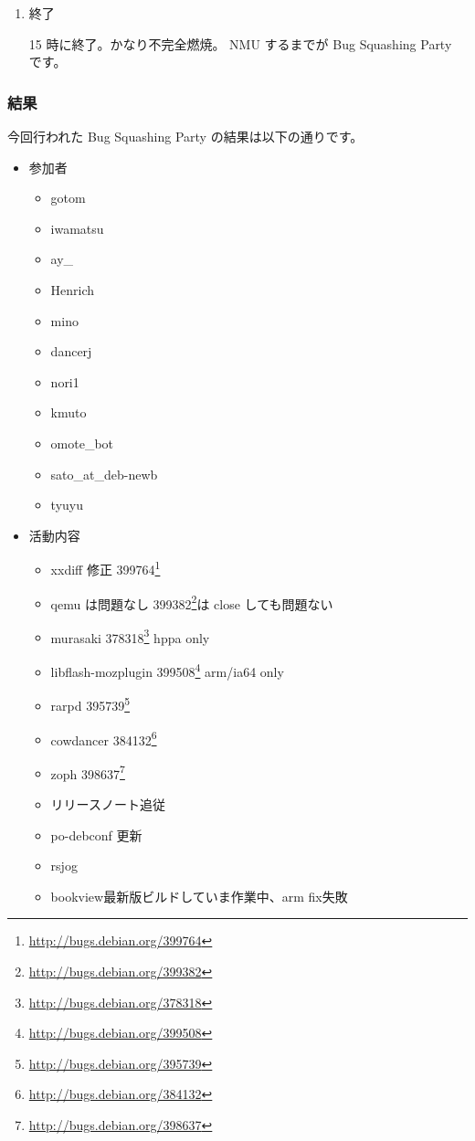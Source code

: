 \documentclass[mingoth,a4paper]{jsarticle}
\newcommand{\debianbug}[1]{#1\footnote{\url{http://bugs.debian.org/#1}}}
\begin{document}
\begin{enumerate}
\begin{itemize}
	\url{http://bugs.debian.org/release-critical/}
  \item 現在の RC バグ情報 
	
	\url{http://bugs.debian.org/release-critical/debian/all.html}
  \item リリースチームが使っている RC バグ管理サイト 
	
\url{http://bts.turmzimmer.net/details.php}
 \end{itemize}
\item 終了

 15 時に終了。かなり不完全燃焼。
 NMU するまでが Bug Squashing Party です。

\end{enumerate}

\subsubsection{結果}
 今回行われた Bug Squashing Party の結果は以下の通りです。

\begin{itemize}
 \item 参加者
   \begin{itemize}
   \item gotom
   \item iwamatsu
   \item ay\_
   \item Henrich
   \item mino
   \item dancerj
   \item nori1
   \item kmuto
   \item omote\_bot
   \item sato\_at\_deb-newb
   \item tyuyu
   \end{itemize}

 \item 活動内容
   \begin{itemize}
   \item xxdiff 修正 \debianbug{399764}
   \item qemu は問題なし \debianbug{399382}は close しても問題ない
   \item murasaki \debianbug{378318} hppa only
   \item libflash-mozplugin \debianbug{399508} arm/ia64 only
   \item rarpd \debianbug{395739}
   \item cowdancer \debianbug{384132}
   \item zoph \debianbug{398637}
   \item リリースノート追従
   \item po-debconf 更新
   \item rsjog
   \item bookview最新版ビルドしていま作業中、arm fix失敗
   \end{itemize}
\end{itemize}
\end{document}
